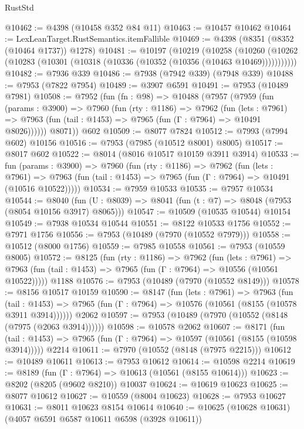 \begin{lexlean}{RustStd}
\begin{coremodule}
@10462 := @4398 (@10458 @352 @84 @11)
@10463 := @10457 @10462
@10464 := LexLeanTarget.RustSemantics.itemFallible
@10469 := @4398 (@8351 (@8352 (@10464 @1737)) @1278)
@10481 := @10197
    (@10219
      (@10258
        (@10260 (@10262 (@10283 (@10301 (@10318 (@10336 (@10352 (@10356 (@10463 @10469)))))))))))
@10482 := @7936 @339
@10486 := @7938 (@7942 @339) (@7948 @339)
@10488 := @7953 (@7822 @7954)
@10489 := @3907 @6591
@10491 := @7953 (@10489 @7981)
@10508 := @7952
    (fun (fn : @98) =>
    @10488
      (@7957
        (@7959
          (fun (params : @3900) =>
          @7960
            (fun (rty : @1186) =>
            @7962
              (fun (lets : @7961) =>
              @7963 (fun (tail : @1453) => @7965 (fun (Γ : @7964) => @10491 @8026))))))
        @8071))
    @602
@10509 := @8077 @7824
@10512 := @7993 (@7994 @602) @10156
@10516 := @7953 (@7985 (@10512 @8001) @8005)
@10517 := @8017 @602
@10522 := @8014 (@8016 @10517 @10159 @3911 @3914)
@10533 := fun (params : @3900) =>
  @7960
    (fun (rty : @1186) =>
    @7962
      (fun (lets : @7961) =>
      @7963 (fun (tail : @1453) => @7965 (fun (Γ : @7964) => @10491 (@10516 @10522)))))
@10534 := @7959 @10533
@10535 := @7957 @10534
@10544 := @8040
    (fun (U : @8039) => @8041 (fun (t : @7) => @8048 (@7953 (@8054 @10156 @3917) @8065)))
@10547 := @10509 (@10535 @10544) @10154
@10549 := @7938 @10534 @10544
@10551 := @8122 @10533 @1756
@10552 := @7971 @1756
@10556 := @7953 (@10489 (@7970 (@10552 @7979)))
@10558 := @10512 (@8000 @1756)
@10559 := @7985 @10558
@10561 := @7953 (@10559 @8005)
@10572 := @8125
    (fun (rty : @1186) =>
    @7962
      (fun (lets : @7961) =>
      @7963 (fun (tail : @1453) => @7965 (fun (Γ : @7964) => @10556 (@10561 @10522)))))
    @1188
@10576 := @7953 (@10489 (@7970 (@10552 @8149)))
@10578 := @8156 @10517 @10159
@10590 := @8147
    (fun (lets : @7961) =>
    @7963
      (fun (tail : @1453) =>
      @7965 (fun (Γ : @7964) => @10576 (@10561 (@8155 (@10578 @3911 @3914))))))
    @2062
@10597 := @7953 (@10489 (@7970 (@10552 (@8148 (@7975 (@2063 @3914))))))
@10598 := @10578 @2062
@10607 := @8171
    (fun (tail : @1453) => @7965 (fun (Γ : @7964) => @10597 (@10561 (@8155 (@10598 @3914)))))
    @2214
@10611 := @7970 (@10552 (@8148 (@7975 @2215)))
@10612 := @10489 @10611
@10613 := @7953 @10612
@10614 := @10598 @2214
@10619 := @8189 (fun (Γ : @7964) => @10613 (@10561 (@8155 @10614)))
@10623 := @8202 (@8205 (@9602 @8210)) @10037
@10624 := @10619 @10623
@10625 := @8077 @10612
@10627 := @10559 (@8004 @10623)
@10628 := @7953 @10627
@10631 := @8011 @10623 @8154 @10614
@10640 := @10625 (@10628 @10631) (@4057 @6591 @6587 @10611 @6598 (@3928 @10611))

\end{coremodule}
\end{lexlean}
